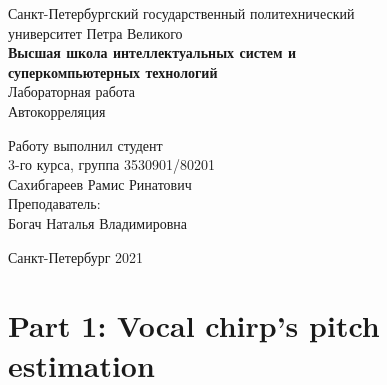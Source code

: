 \documentclass[a4paper]{article}
\begin{document}
    \begin{center}
        \begin{center}
        \hfill \break
        \normalsize{Санкт-Петербургский государственный политехнический}\\
        \normalsize{университет Петра Великого}\\
        \hfill \break
        \normalsize{\textbf{Высшая школа интеллектуальных систем и}}\\ 
        \normalsize{\textbf{суперкомпьютерных технологий}}\\ 
        \hfill \break
        \hfill \break
        \hfill \break
        \normalsize{Лабораторная работа}\\
        \hfill \break
        \hfill \break
        \normalsize{\LARGE Автокорреляция}\\
        \end{center}
        \hfill \break
        \hfill \break
        \hfill \break
        \hfill \break
        \hfill \break
        \hfill \break
        \hfill \break
        \hfill \break
        \hfill \break
        \hfill \break
        \begin{flushright}
            \normalsize{Работу выполнил студент}\\
            \normalsize{3-го курса, группа 3530901/80201}\\
            \normalsize{Сахибгареев Рамис Ринатович}\\
            \hfill \break
            \normalsize{Преподаватель:}\\
            \normalsize{Богач Наталья Владимировна}\\
        \end{flushright}
        \hfill \break
        \hfill \break
        \hfill \break
        \hfill \break
        \begin{center} Санкт-Петербург 2021 \end{center}
        \thispagestyle{empty}
    \end{center}
    
    \newpage
        \tableofcontents
    
    \newpage
         \listoffigures
    
    \newpage
         \lstlistoflistings   
     
    \newpage
        \section{Part 1: Vocal chirp's pitch estimation}
        
\end{document}
